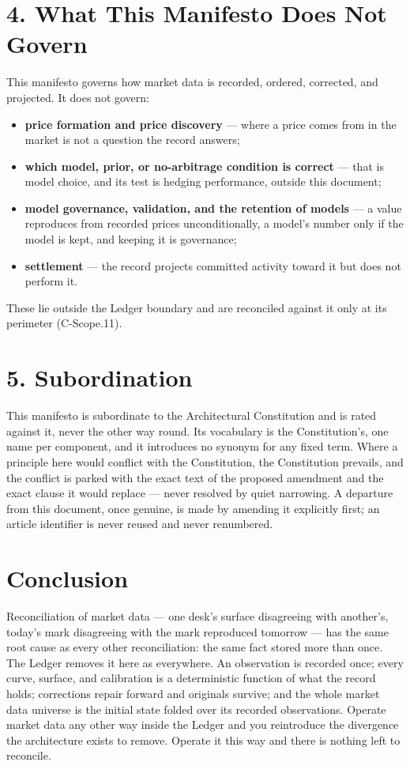 \documentclass[11pt,a4paper]{article}
\begin{document}
\section{4. What This Manifesto Does Not Govern}

This manifesto governs how market data is recorded, ordered, corrected,
and projected. It does not govern:
\begin{itemize}
\item \textbf{price formation and price discovery} --- where a price
  comes from in the market is not a question the record answers;
\item \textbf{which model, prior, or no-arbitrage condition is correct}
  --- that is model choice, and its test is hedging performance, outside
  this document;
\item \textbf{model governance, validation, and the retention of
  models} --- a value reproduces from recorded prices unconditionally, a
  model's number only if the model is kept, and keeping it is
  governance;
\item \textbf{settlement} --- the record projects committed activity
  toward it but does not perform it.
\end{itemize}
These lie outside the Ledger boundary and are reconciled against it only
at its perimeter (C-Scope.11).

\section{5. Subordination}

This manifesto is subordinate to the Architectural Constitution and is
rated against it, never the other way round. Its vocabulary is the
Constitution's, one name per component, and it introduces no synonym for
any fixed term. Where a principle here would conflict with the
Constitution, the Constitution prevails, and the conflict is parked with
the exact text of the proposed amendment and the exact clause it would
replace --- never resolved by quiet narrowing. A departure from this
document, once genuine, is made by amending it explicitly first; an
article identifier is never reused and never renumbered.

\section{Conclusion}

Reconciliation of market data --- one desk's surface disagreeing with
another's, today's mark disagreeing with the mark reproduced tomorrow ---
has the same root cause as every other reconciliation: the same fact
stored more than once. The Ledger removes it here as everywhere. An
observation is recorded once; every curve, surface, and calibration is a
deterministic function of what the record holds; corrections repair
forward and originals survive; and the whole market data universe is the
initial state folded over its recorded observations. Operate market data any
other way inside the Ledger and you reintroduce the divergence the
architecture exists to remove. Operate it this way and there is nothing
left to reconcile.
\end{document}
